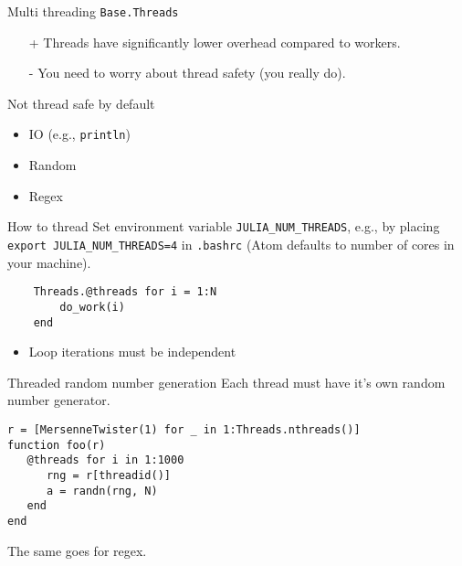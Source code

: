 \documentclass[10pt]{beamer}
\begin{document}
\begin{frame}{Multi threading}{}
    \texttt{Base.Threads}
    \begin{itemize}
        \item[+] Threads have significantly lower overhead compared to workers.
        \item[-] You need to worry about thread safety (you really do).
    \end{itemize}
\end{frame}

\begin{frame}{Not thread safe by default}{}
    \begin{itemize}
        \item IO (e.g., \texttt{println})
        \item Random
        \item Regex
    \end{itemize}
\end{frame}

\begin{frame}[fragile]{How to thread}{}
    Set environment variable \texttt{JULIA\_NUM\_THREADS}, e.g., by placing \texttt{export JULIA\_NUM\_THREADS=4} in \texttt{.bashrc} (Atom defaults to number of cores in your machine).

    \begin{verbatim}
    Threads.@threads for i = 1:N
        do_work(i)
    end
    \end{verbatim}

    \begin{itemize}
        \item Loop iterations must be independent
    \end{itemize}
\end{frame}


\begin{frame}[fragile]{Threaded random number generation}{}
Each thread must have it's own random number generator.
    \begin{verbatim}
r = [MersenneTwister(1) for _ in 1:Threads.nthreads()]
function foo(r)
   @threads for i in 1:1000
      rng = r[threadid()]
      a = randn(rng, N)
   end
end
    \end{verbatim}
    The same goes for regex.
\end{frame}
\end{document}
